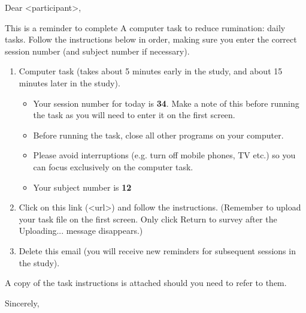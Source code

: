 Dear <participant>,

This is a reminder to complete {\textquotedbl}A computer task to reduce rumination: daily tasks{\textquotedbl}. Follow
the instructions below in order, making sure you enter the correct session number (and subject number if necessary).

\begin{enumerate}
  \item Computer task (takes about 5 minutes early in the study, and about 15 minutes later in the study).

  \begin{itemize}
    \item Your session number for today is \textbf{34}. Make a note of
    this before running the task as you will need to enter it on the
    first screen.
    \item Before running the task, close all other programs on your computer.
    \item Please avoid interruptions (e.g. turn off mobile phones, TV etc.) so you can focus exclusively on the computer task.
    \item Your subject number is \textbf{12}
  \end{itemize}

  \item Click on this link (<url>) and follow the instructions. (Remember
  to upload your task file on the first screen. Only click
  {\textquotedbl}Return to survey{\textquotedbl} after the
  {\textquotedbl}Uploading...{\textquotedbl} message disappears.)

  \item Delete this email (you will receive new reminders for subsequent sessions in the study).
\end{enumerate}

A copy of the task instructions is attached should you need to refer to them.

Sincerely,
